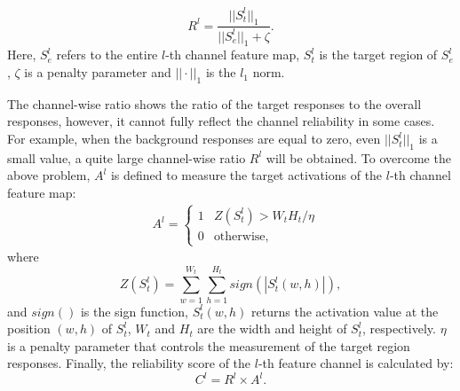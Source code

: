 \documentclass[runningheads]{llncs}
\begin{document}
\begin{equation}\label{TAR}
 R^{l} = \frac{||S_{t}^{l}||_{1}}{||S_{e}^{l}||_{1} + \zeta}.
\end{equation}
Here, $S_{e}^{l}$ refers to the entire $l$-th channel feature map, $S_{t}^{l}$ is the target region of $S_{e}^{l}$, $\zeta$ is a penalty parameter and ${||\cdot||}_{1}$ is the $l_{1}$ norm. 

The channel-wise ratio shows the ratio of the target responses to the overall responses, however, it cannot fully reflect the channel reliability in some cases. For example, when the background responses are equal to zero, even $||S_{t}^{l}||_{1}$ is a small value, a quite large channel-wise ratio $R^{l}$ will be obtained. To overcome the above problem, $A^{l}$ is defined to measure the target activations of the $l$-th channel feature map:
\begin{equation}\label{E}
\begin{split}
&  A^{l} = 
\begin{cases}
1 &  Z(S_{t}^{l})>W_{t}H_{t}/\eta  \\
0 & \text{otherwise},
\end{cases}
\end{split}
\end{equation}
where
\begin{equation}\label{E2}
Z(S_{t}^{l}) = \sum_{w=1}^{W_{t}} \sum_{h=1}^{H_t} sign(|S_{t}^{l}(w, h)|),
\end{equation}
and $sign()$ is the sign function, $S_{t}^{l}(w, h)$ returns the activation value at the position $(w, h)$ of $S_{t}^{l}$, $W_t$ and $H_t$ are the width and height of $S_{t}^{l}$, respectively. $\eta$ is a penalty parameter that controls the measurement of the target region responses. Finally, the reliability score of the $l$-th feature channel is calculated by:
\begin{equation}\label{TAR}
 C^l = R^{l} \times A^{l}.
\end{equation}
\end{document}
